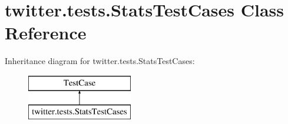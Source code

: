 \hypertarget{classtwitter_1_1tests_1_1StatsTestCases}{\section{twitter.\-tests.\-Stats\-Test\-Cases Class Reference}
\label{classtwitter_1_1tests_1_1StatsTestCases}
}
Inheritance diagram for twitter.\-tests.\-Stats\-Test\-Cases\-:\begin{figure}[H]
\begin{center}
\leavevmode
\includegraphics[height=2.000000cm]{classtwitter_1_1tests_1_1StatsTestCases}
\end{center}
\end{figure}
